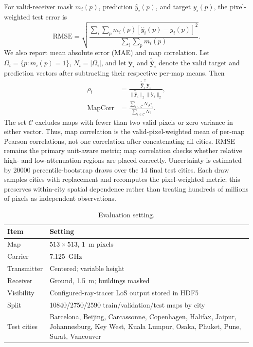 \documentclass[10pt,conference]{IEEEtran}
\begin{document}
For valid-receiver mask $m_i(p)$, prediction $\hat y_i(p)$, and target
$y_i(p)$, the pixel-weighted test error is
\begin{equation}
\mathrm{RMSE}=\sqrt{
\frac{\sum_i\sum_p m_i(p)[\hat y_i(p)-y_i(p)]^2}
{\sum_i\sum_p m_i(p)}}.
\label{eq:rmse}
\end{equation}
We also report mean absolute error (MAE) and map correlation. Let
$\Omega_i=\{p:m_i(p)=1\}$, $N_i=|\Omega_i|$, and let
$\widetilde{\mathbf y}_i$ and $\widetilde{\hat{\mathbf y}}_i$ denote the valid
target and prediction vectors after subtracting their respective per-map
means. Then
\begin{equation}
\begin{aligned}
\rho_i&=\frac{\widetilde{\hat{\mathbf y}}_i^{\top}
\widetilde{\mathbf y}_i}
{\|\widetilde{\hat{\mathbf y}}_i\|_2\|\widetilde{\mathbf y}_i\|_2},\\
\mathrm{MapCorr}&=\frac{\sum_{i\in\mathcal C}N_i\rho_i}
{\sum_{i\in\mathcal C}N_i}.
\end{aligned}
\label{eq:mapcorr}
\end{equation}
The set $\mathcal C$ excludes maps with fewer than two valid pixels or zero
variance in either vector. Thus, map correlation is the valid-pixel-weighted
mean of per-map Pearson correlations, not one correlation after concatenating
all cities. RMSE remains the primary unit-aware metric; map correlation checks
whether relative high- and low-attenuation regions are placed correctly.
Uncertainty is estimated by 20000 percentile-bootstrap draws over the 14 final
test cities. Each draw samples cities with replacement and recomputes the
pixel-weighted metric; this preserves within-city spatial dependence rather
than treating hundreds of millions of pixels as independent observations.

\begin{table}[t]
\centering
\caption{Evaluation setting.}
\label{tab:setting}
\scriptsize
\setlength{\tabcolsep}{3.5pt}
\begin{tabularx}{\columnwidth}{lX}
\toprule
Item & Setting \\
\midrule
Map & $513\times513$, \SI{1}{m} pixels \\
Carrier & \SI{7.125}{GHz} \\
Transmitter & Centered; variable height \\
Receiver & Ground, \SI{1.5}{m}; buildings masked \\
Visibility & Configured-ray-tracer LoS output stored in HDF5 \\
Split & 10840/2750/2590 train/validation/test maps by city \\
Test cities & Barcelona, Beijing, Carcassonne, Copenhagen, Halifax,
Jaipur, Johannesburg, Key West, Kuala Lumpur, Osaka, Phuket, Pune, Surat,
Vancouver \\
\bottomrule
\end{tabularx}
\end{table}
\end{document}
